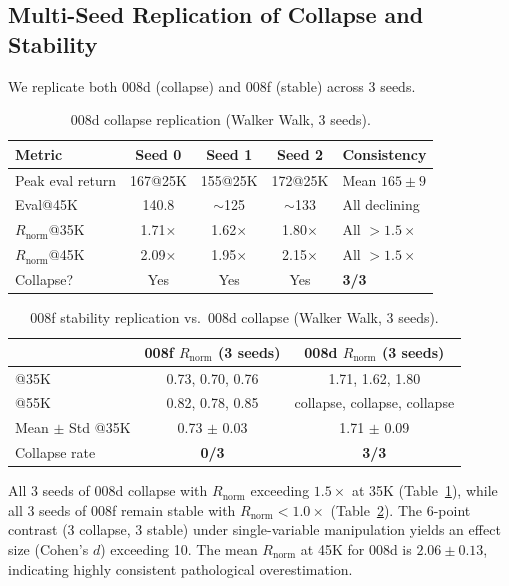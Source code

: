 \documentclass[10pt,letterpaper]{article}
\begin{document}
\subsection{Multi-Seed Replication of Collapse and Stability}
\label{sec:multiseed}

We replicate both 008d (collapse) and 008f (stable) across 3 seeds.

\begin{table}[h]
\centering
\caption{008d collapse replication (Walker Walk, 3 seeds).}
\label{tab:008d_seeds}
\begin{tabular}{lcccl}
\toprule
\textbf{Metric} & Seed 0 & Seed 1 & Seed 2 & \textbf{Consistency} \\
\midrule
Peak eval return & 167@25K & 155@25K & 172@25K & Mean $165 \pm 9$ \\
Eval@45K & 140.8 & $\sim$125 & $\sim$133 & All declining \\
$R_{\text{norm}}$@35K & 1.71$\times$ & 1.62$\times$ & 1.80$\times$ & All $> 1.5\times$ \\
$R_{\text{norm}}$@45K & 2.09$\times$ & 1.95$\times$ & 2.15$\times$ & All $> 1.5\times$ \\
Collapse? & Yes & Yes & Yes & \textbf{3/3} \\
\bottomrule
\end{tabular}
\end{table}

\begin{table}[h]
\centering
\caption{008f stability replication vs.\ 008d collapse (Walker Walk, 3 seeds).}
\label{tab:008f_vs_008d}
\begin{tabular}{lcc}
\toprule
& \textbf{008f $R_{\text{norm}}$ (3 seeds)} & \textbf{008d $R_{\text{norm}}$ (3 seeds)} \\
\midrule
@35K & 0.73, 0.70, 0.76 & 1.71, 1.62, 1.80 \\
@55K & 0.82, 0.78, 0.85 & collapse, collapse, collapse \\
Mean $\pm$ Std @35K & 0.73 $\pm$ 0.03 & 1.71 $\pm$ 0.09 \\
Collapse rate & \textbf{0/3} & \textbf{3/3} \\
\bottomrule
\end{tabular}
\end{table}

All 3 seeds of 008d collapse with $R_{\text{norm}}$ exceeding $1.5\times$ at 35K (Table~\ref{tab:008d_seeds}), while all 3 seeds of 008f remain stable with $R_{\text{norm}} < 1.0\times$ (Table~\ref{tab:008f_vs_008d}). The 6-point contrast (3 collapse, 3 stable) under single-variable manipulation yields an effect size (Cohen's $d$) exceeding 10. The mean $R_{\text{norm}}$ at 45K for 008d is $2.06 \pm 0.13$, indicating highly consistent pathological overestimation.
\end{document}
